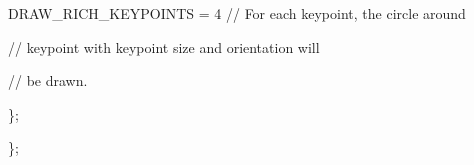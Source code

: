 {\ttfamily }

{\ttfamily }

{\ttfamily D\+R\+A\+W\+\_\+\+R\+I\+C\+H\+\_\+\+K\+E\+Y\+P\+O\+I\+N\+TS = 4 // For each keypoint, the circle around}

{\ttfamily }

{\ttfamily }

{\ttfamily // keypoint with keypoint size and orientation will}

{\ttfamily }

{\ttfamily }

{\ttfamily // be drawn.}

{\ttfamily }

{\ttfamily }

{\ttfamily \};}

{\ttfamily }

{\ttfamily }

{\ttfamily \};}

{\ttfamily }

{\ttfamily }

{\ttfamily }


